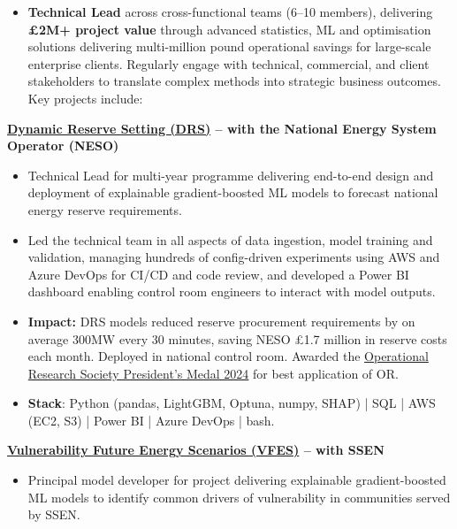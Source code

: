 \documentclass{my_cv}
\begin{document}
%
{\begin{itemize}[topsep=0pt,itemsep=0pt,partopsep=0pt,parsep=0pt]
    \item \textbf{Technical Lead} across cross-functional teams (6–10 members), delivering \textbf{£2M+ project value} through advanced statistics, ML and optimisation solutions delivering multi-million pound operational savings for large-scale enterprise clients. Regularly engage with technical, commercial, and client stakeholders to translate complex methods into strategic business outcomes. Key projects include:
\end{itemize}
\textbf{\href{https://www.smithinst.co.uk/case-studies/using-explainable-ai-to-reduce-risk-and-improve-efficiency-in-uk-electricity-reserve-setting-2/}{Dynamic Reserve Setting (DRS)} – with the National Energy System Operator (NESO)}
\begin{itemize}[topsep=0pt,itemsep=0pt,partopsep=0pt,parsep=0pt]
    \item Technical Lead for multi-year programme delivering end-to-end design and deployment of explainable gradient-boosted ML models to forecast national energy reserve requirements.
    \item Led the technical team in all aspects of data ingestion, model training and validation, managing hundreds of config-driven experiments using AWS and Azure DevOps for CI/CD and code review, and developed a Power BI dashboard enabling control room engineers to interact with model outputs.
    \item \textbf{Impact:} DRS models reduced reserve procurement requirements by on average 300MW every 30 minutes, saving NESO £1.7 million in reserve costs each month. Deployed in national control room. Awarded the \href{https://doi.org/10.1080/2058802X.2025.2499378}{Operational Research Society President’s Medal 2024} for best application of OR.
    \item \textbf{Stack}: Python (pandas, LightGBM, Optuna, numpy, SHAP) | SQL | AWS (EC2, S3) | Power BI | Azure DevOps | bash.
\end{itemize}
\textbf{\href{https://www.ssen.co.uk/news-views/2024/SSEN-puts-vulnerable-customers-at-heart-of-future-energy-strategy/}{Vulnerability Future Energy Scenarios (VFES)} – with SSEN}
\begin{itemize}[topsep=0pt,itemsep=0pt,partopsep=0pt,parsep=0pt]
    \item Principal model developer for project delivering explainable gradient-boosted ML models to identify common drivers of vulnerability in communities served by SSEN.

\end{itemize}}
\end{document}
